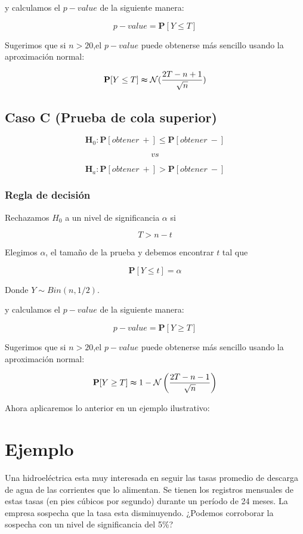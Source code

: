 \documentclass[
  a4paper,
  oneside,
  openany]{book}
\begin{document}
y calculamos el \(p-value\) de la siguiente manera:

\[p-value=\mathbf{P}[Y\leq T]\]

Sugerimos que si \(n>20\),el \(p-value\) puede obtenerse más sencillo usando la aproximación normal:

\[\mathbf{P}[Y\leq T] \thickapprox  \mathcal{N} (\frac{2T-n+1}{\sqrt{n}})\]

\hypertarget{caso-c-prueba-de-cola-superior-2}{%
\subsection*{Caso C (Prueba de cola superior)}\label{caso-c-prueba-de-cola-superior-2}}


\[\textbf{H}_0: \mathbf{P}[obtener\ +] \leq \mathbf{P}[obtener\ -]\]

\[vs\]

\[\textbf{H}_a: \mathbf{P}[obtener\ +] > \mathbf{P}[obtener\ -]\]

\hypertarget{regla-de-decisiuxf3n-12}{%
\subsubsection*{Regla de decisión}\label{regla-de-decisiuxf3n-12}}


Rechazamos \(H_0\) a un nivel de significancia \(\alpha\) si

\[T > n-t \]

Elegimos \(\alpha\), el tamaño de la prueba y debemos encontrar \(t\) tal que

\[\mathbf{P}[Y \leq t]=\alpha\]

Donde \(Y \sim Bin (n,1/2)\).

y calculamos el \(p-value\) de la siguiente manera:

\[p-value=\mathbf{P}[Y\geq T]\]

Sugerimos que si \(n > 20\),el \(p-value\) puede obtenerse más sencillo usando la aproximación normal:

\[\mathbf{P}[Y\geq T] \thickapprox 1- \mathcal{N} \left(\frac{2T-n-1}{\sqrt{n}}\right)\]

Ahora aplicaremos lo anterior en un ejemplo ilustrativo:

\hypertarget{ejemplo-4}{%
\section{Ejemplo}\label{ejemplo-4}}

Una hidroeléctrica esta muy interesada en seguir las tasas promedio de descarga de agua de las corrientes que lo alimentan. Se tienen los registros mensuales de estas tasas (en pies cúbicos por segundo) durante un período de 24 meses.
La empresa sospecha que la tasa esta disminuyendo. ¿Podemos corroborar la sospecha con un nivel de significancia del 5\%?
\end{document}
